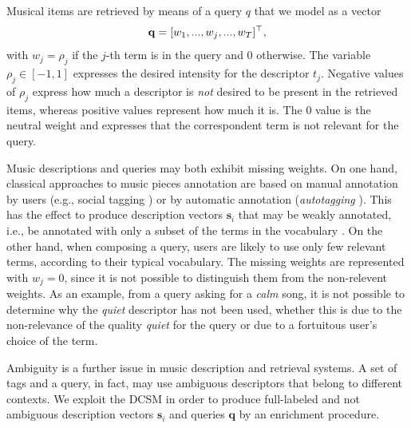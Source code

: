 Musical items are retrieved by means of a query $q$ that we model as a vector 
\begin{equation}
\mathbf{q} = \lbrack w_1,...,w_j,...,w_{T} \rbrack ^\top ,
\label{eq:DCSM:q}
\end{equation}
 with $w_j=\rho_j$ if the $j$-th term is in the query and 0 otherwise. The variable $\rho_j \in [-1, 1]$ expresses the desired intensity for the descriptor $t_j$. %
Negative values of $\rho_j$ express how much a descriptor is \textit{not} desired to be present in the retrieved items, whereas positive values represent how much it is. The $0$ value is the neutral weight and expresses that the correspondent term is not relevant for the query.

Music descriptions and queries may both exhibit missing weights. On one hand, classical approaches to music pieces annotation are based on manual annotation by users (e.g., social tagging \cite{lamere2009}) or by automatic annotation (\textit{autotagging} \cite{Zanoni2012}). This has the effect to produce description vectors $\mathbf{s}_i$ that may be weakly annotated, i.e., be annotated with only a subset of the terms in the vocabulary \cite{lamere2009, Miotto2012}. 
On the other hand, when composing a query, users are likely to use only few relevant terms, according to their typical vocabulary. The missing weights are represented with $w_j=0$, since it is not possible to distinguish them from the non-relevent weights. As an example, from a query asking for a \textit{calm} song, it is not possible to determine why the \textit{quiet} descriptor has not been used, whether this is due to the non-relevance of the quality \textit{quiet} for the query or due to a fortuitous user's choice of the term. 

Ambiguity is a further issue in music description and retrieval systems. A set of tags and a query, in fact, may use ambiguous descriptors that belong to different contexts.
We exploit the DCSM in order to produce full-labeled and not ambiguous description vectors $\mathbf{s}_i$ and queries $\mathbf{q}$ by an enrichment procedure.


